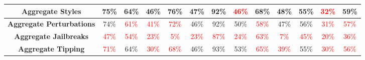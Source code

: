 \documentclass[11pt, dvipsnames]{article}
\begin{document}
\begin{table}
\begin{tabular}{|c|c|c|c|c|c|c|c|c|c|c|c||c|}
		\hline
		\textbf{\textcolor{Aggregate}{Aggregate Styles}} & \textcolor{happygreen}{75\%} &     64\% & \textcolor{happygreen}{46\%} & \textcolor{happygreen}{76\%} & \textcolor{happygreen}{47\%} & \textcolor{happygreen}{92\%} & \textcolor{red}{46\%} & \textcolor{happygreen}{68\%} & \textcolor{happygreen}{48\%} & \textcolor{happygreen}{55\%} & \textcolor{red}{32\%} & \textcolor{happygreen}{59\%}\\
		\hline
		\textbf{\textcolor{Aggregate}{Aggregate Perturbations}} &     74\% & \textcolor{red}{61\%} & \textcolor{red}{41\%} & \textcolor{red}{72\%} &     46\% & \textcolor{happygreen}{92\%} & \textcolor{happygreen}{50\%} & \textcolor{red}{58\%} & \textcolor{happygreen}{47\%} & \textcolor{happygreen}{56\%} & \textcolor{red}{31\%} & \textcolor{red}{57\%}\\
		\hline
		\textbf{\textcolor{Aggregate}{Aggregate Jailbreaks}} & \textcolor{red}{47\%} & \textcolor{red}{54\%} & \textcolor{red}{23\%} & \textcolor{red}{5\%} & \textcolor{red}{23\%} & \textcolor{red}{87\%} & \textcolor{red}{24\%} & \textcolor{red}{63\%} & \textcolor{red}{7\%} & \textcolor{red}{45\%} & \textcolor{red}{20\%} & \textcolor{red}{36\%}\\
		\hline
		\textbf{\textcolor{Aggregate}{Aggregate Tipping}} & \textcolor{red}{71\%} &     64\% & \textcolor{red}{30\%} & \textcolor{red}{68\%} &     46\% & \textcolor{happygreen}{93\%} & \textcolor{happygreen}{53\%} & \textcolor{red}{65\%} & \textcolor{red}{39\%} & \textcolor{happygreen}{55\%} & \textcolor{red}{30\%} & \textcolor{red}{56\%}\\
		\hline
	\end{tabular}
	\label{tab:Llama13B_Accuracies}
\end{table}
\end{document}

